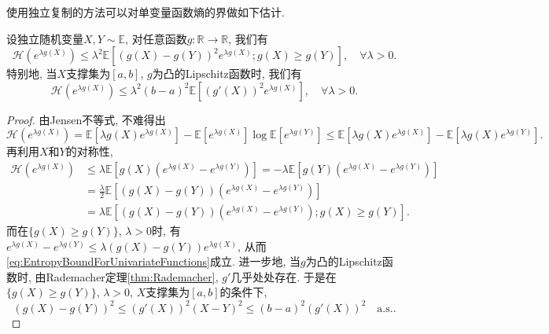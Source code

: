 使用独立复制的方法可以对单变量函数熵的界做如下估计. 
\begin{lemma}[单变量函数熵的界]\label{lemma:EntropyBoundForUnivariateFunctions}
	设独立随机变量$X, Y \sim \mathbb{E}$, 对任意函数$g \colon \mathbb{R} \to \mathbb{R}$, 我们有
	\begin{equation}\label{eq:EntropyBoundForUnivariateFunctions}
		\mathcal{H}(e^{\lambda g(X)})
		\leq \lambda^2 \mathbb{E}[ (g(X) - g(Y))^2 e^{\lambda g(X)}; g(X) \geq g(Y) ], \quad \forall \lambda > 0.
	\end{equation}
	特别地, 当$X$支撑集为$[a, b]$, $g$为凸的Lipschitz函数时, 我们有
	\begin{equation*}
		\mathcal{H}(e^{\lambda g(X)}) 
		\leq \lambda^2 (b-a)^2 \mathbb{E}[(g'(X))^2 e^{\lambda g(X)}], \quad \forall \lambda > 0.
	\end{equation*}
\end{lemma}
\begin{proof}
	由Jensen不等式, 不难得出
	\begin{equation*}
		\mathcal{H}(e^{\lambda g(X)})
		= \mathbb{E}[\lambda g(X) e^{\lambda g(X)}] - \mathbb{E}[e^{\lambda g(X)}] \log \mathbb{E}[e^{\lambda g(Y)}] 
		\leq \mathbb{E}[\lambda g(X) e^{\lambda g(X)}] - \mathbb{E}[\lambda g(X) e^{\lambda g(Y)}].
	\end{equation*}
	再利用$X$和$Y$的对称性, 
	\begin{align*}
		\mathcal{H}(e^{\lambda g(X)})
		&\leq \lambda \mathbb{E}[ g(X) (e^{\lambda g(X)}-  e^{\lambda g(Y)})] 
		= - \lambda \mathbb{E}[ g(Y) (e^{\lambda g(X)}-  e^{\lambda g(Y)})] \\
		&= \frac{\lambda}{2} \mathbb{E}\left[(g(X) - g(Y)) (e^{\lambda g(X)} - e^{\lambda g(Y)})\right] \\
		&= \lambda \mathbb{E}\left[(g(X) - g(Y)) (e^{\lambda g(X)} - e^{\lambda g(Y)}); g(X) \geq g(Y) \right].
	\end{align*}
	而在$\{g(X) \geq g(Y)\}$, $\lambda > 0$时, 有$e^{\lambda g(X)} - e^{\lambda g(Y)} \leq \lambda(g(X) - g(Y)) e^{\lambda g(X)}$, 从而\eqref{eq:EntropyBoundForUnivariateFunctions}成立. 
	进一步地, 当$g$为凸的Lipschitz函数时, 由Rademacher定理\ref{thm:Rademacher}, $g'$几乎处处存在. 
	于是在$\{g(X) \geq g(Y)\}$, $\lambda > 0$, $X$支撑集为$[a, b]$的条件下,
	\begin{equation*}
		(g(X) - g(Y))^2 \leq (g'(X))^2 (X-Y)^2 \leq (b-a)^2 (g'(X))^2 \quad \text{a.s.}.
	\end{equation*}
\end{proof}


